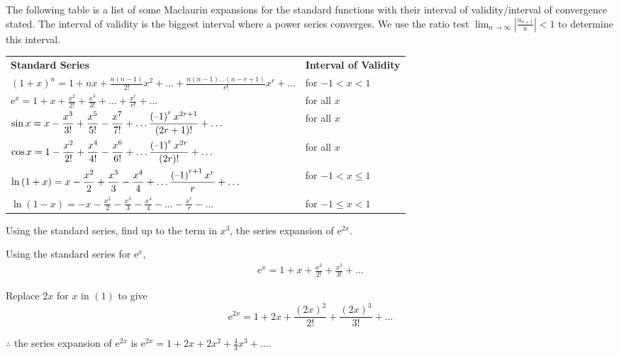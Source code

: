 \documentclass[11pt,a4paper]{book}
\begin{document}
The following table is a list of some Maclaurin expansions for the
standard functions with their interval of validity/interval of convergence
stated. The interval of validity is the biggest interval where a power
series converges. We use the ratio test ${\displaystyle \lim_{n\rightarrow\infty}\left|\frac{a_{n+1}}{a}\right|<1}$
to determine this interval.
\begin{center}
\begin{tcolorbox}[colback=blue!5, colframe=black, boxrule=.4pt, sharpish corners]

\setlength{\extrarowheight}{0.4cm}

\begin{tabular}[b]{>{\raggedright}m{11cm}>{\raggedright}m{4cm}}
\textbf{Standard Series} & \textbf{Interval of Validity}\tabularnewline
${\displaystyle \left(1+x\right)^{n}=1+nx+\frac{n\left(n-1\right)}{2!}x^{2}+\ldots+\frac{n\left(n-1\right)\ldots\left(n-r+1\right)}{{r!}}}x^{r}+\ldots$ & for $-1<x<1$\tabularnewline
${\displaystyle \mathrm{e}^{x}=1+x+\frac{{x^{2}}}{{2!}}+\frac{{x^{3}}}{{3!}}+\ldots+\frac{{x^{r}}}{{r!}}+\ldots}$ & for all $x$\tabularnewline
${\displaystyle \sin x=x-\frac{x^{3}}{3!}+\frac{x^{5}}{5!}-\frac{x^{7}}{7!}+\ldots\frac{\left(\text{\textendash}1\right)^{r}x^{2r+1}}{\left(2r+1\right)!}+\ldots}$ & for all $x$\tabularnewline
${\displaystyle \cos x=1-\frac{x^{2}}{2!}+\frac{x^{4}}{4!}-\frac{x^{6}}{6!}+\ldots\frac{\left(\text{\textendash}1\right)^{r}x^{2r}}{\left(2r\right)!}+\ldots}$ & for all $x$\tabularnewline
${\displaystyle \ln\left(1+x\right)=x-\frac{x^{2}}{2}+\frac{x^{3}}{3}-\frac{x^{4}}{4}+\ldots\frac{\left(\text{\textendash}1\right)^{r+1}x^{r}}{r}+\ldots}$ & for $-1<x\leq1$\tabularnewline
${\displaystyle \ln\left(1-x\right)=-x-\frac{x^{2}}{2}-\frac{x^{3}}{3}-\frac{x^{4}}{4}-\ldots-\frac{x^{r}}{r}}-\ldots$ & for $-1\leq x<1$\tabularnewline
\end{tabular}
\end{tcolorbox}
\par\end{center}

\begin{example}

Using the standard series, find up to the term in $x^{3}$, the series
expansion of $\mathrm{e}^{2x}$.

\Solution

Using the standard series for $\mathrm{e}^{x}$,
\begin{align*}
\mathrm{e}^{x}=1+x+\frac{{x^{2}}}{{2!}}+\frac{{x^{3}}}{{3!}}+\ldots\tag{1}
\end{align*}


Replace $2x$ for $x$ in $\left(1\right)$ to give
\[
\mathrm{e}^{2x}=1+2x+\frac{{\left(2x\right)^{2}}}{{2!}}+\frac{{\left(2x\right)^{3}}}{{3!}}+\ldots
\]

$\therefore$ the series expansion of $\mathrm{e}^{2x}$ is ${\displaystyle \mathrm{e}^{2x}=1+2x+2x^{2}+\frac{4}{3}x^{3}+\ldots}$.

\end{example}
\end{document}
